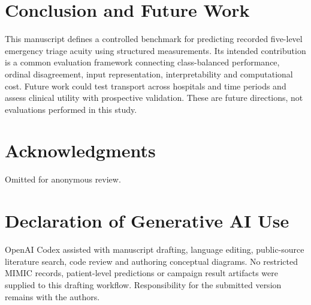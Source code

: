 \section{Conclusion and Future Work}
This manuscript defines a controlled benchmark for predicting recorded
five-level emergency triage acuity using structured measurements.
Its intended contribution is a common evaluation framework connecting
class-balanced performance, ordinal disagreement, input representation,
interpretability and computational cost.
Future work could test transport across hospitals and time periods and
assess clinical utility with prospective validation. These are future
directions, not evaluations performed in this study.

\section*{Acknowledgments}
Omitted for anonymous review.

\section*{Declaration of Generative AI Use}
OpenAI Codex assisted with manuscript drafting, language editing, public-source
literature search, code review and authoring conceptual diagrams.
No restricted MIMIC records, patient-level
predictions or campaign result artifacts were supplied to this drafting
workflow. Responsibility for the submitted version remains with the authors.




